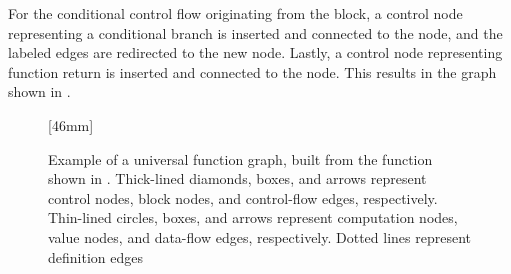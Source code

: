 %
For the conditional control flow originating from the 
\gls{block}, a \gls{control node} representing a conditional branch is inserted
and connected to the  \gls{node}, and the labeled \glspl{edge}
are redirected to the new \gls{node}.
%
Lastly, a \gls{control node} representing \gls{function} return is inserted and
connected to the  \gls{node}.
%
This results in the \gls{graph} shown in
.

\begin{figure}
  \centering

  \mbox{}%
  \hfill%
                [46mm]%
                {%
                }%
  \hfill%
                {%
                }%
  \hfill%
  \mbox{}

  \vspace{\betweensubfigures}

                {%
                  \parbox{\textwidth}{%
                    \parbox[b]{32mm}{%
                    }%
                    \hfill%
                    \parbox[b]{63mm}{%
                      \vspace*{1cm}%
                    }%
                  }%
                }%

  \caption[Example of a universal function graph]%
          {%
            Example of a universal function graph, built from the \gls{function}
            shown in .
            Thick-lined diamonds, boxes, and arrows represent control nodes,
            block nodes, and control-flow edges, respectively.
            Thin-lined circles, boxes, and arrows represent computation nodes,
            value nodes, and data-flow edges, respectively.
            Dotted lines represent definition edges%
          }
\end{figure}

